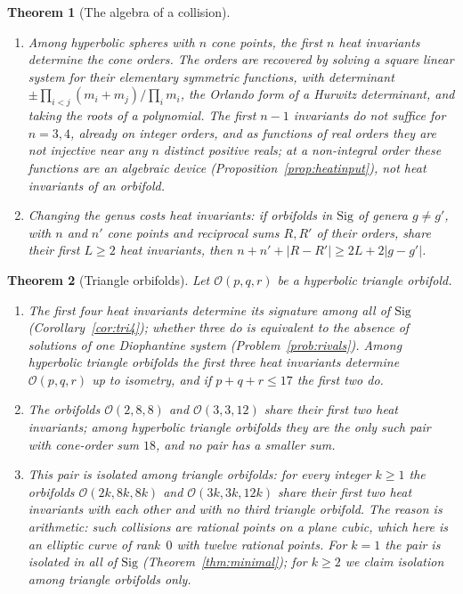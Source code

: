 \documentclass[pdflatex,sn-mathphys-num]{sn-jnl}
\theoremstyle{thmstyleone}%
\newtheorem{theorem}{Theorem}[section]%
\theoremstyle{thmstylethree}%
\newcommand{\Orb}{\mathcal{O}}
\newcommand{\Sig}{\mathrm{Sig}}
\begin{document}
\begin{theorem}[The algebra of a collision]\label{thm:intro-algebra}
\leavevmode
\begin{enumerate}[label=(\roman*)]
\item Among hyperbolic spheres with $n$ cone points, the first $n$ heat invariants determine the cone orders. The orders are recovered by solving a square linear system for their elementary symmetric functions, with determinant $\pm\prod_{i<j}(m_i+m_j)/\prod_im_i$, the Orlando form of a Hurwitz determinant, and taking the roots of a polynomial. The first $n-1$ invariants do not suffice for $n=3,4$, already on integer orders, and as functions of real orders they are not injective near any $n$ distinct positive reals; at a non-integral order these functions are an algebraic device (Proposition~\ref{prop:heatinput}), not heat invariants of an orbifold.
\item Changing the genus costs heat invariants: if orbifolds in $\Sig$ of genera $g\ne g'$, with $n$ and $n'$ cone points and reciprocal sums $R,R'$ of their orders, share their first $L\ge2$ heat invariants, then $n+n'+|R-R'|\ge2L+2|g-g'|$.
\end{enumerate}
\end{theorem}

\begin{theorem}[Triangle orbifolds]\label{thm:intro-rigid}
Let $\Orb(p,q,r)$ be a hyperbolic triangle orbifold.
\begin{enumerate}[label=(\roman*)]
\item The first four heat invariants determine its signature among all of $\Sig$ (Corollary~\ref{cor:tri4}); whether three do is equivalent to the absence of solutions of one Diophantine system (Problem~\ref{prob:rivals}). Among hyperbolic triangle orbifolds the first three heat invariants determine $\Orb(p,q,r)$ up to isometry, and if $p+q+r\le17$ the first two do.
\item The orbifolds $\Orb(2,8,8)$ and $\Orb(3,3,12)$ share their first two heat invariants; among hyperbolic triangle orbifolds they are the only such pair with cone-order sum $18$, and no pair has a smaller sum.
\item This pair is isolated among triangle orbifolds: for every integer $k\ge1$ the orbifolds $\Orb(2k,8k,8k)$ and $\Orb(3k,3k,12k)$ share their first two heat invariants with each other and with no third triangle orbifold. The reason is arithmetic: such collisions are rational points on a plane cubic, which here is an elliptic curve of rank~$0$ with twelve rational points. For $k=1$ the pair is isolated in all of $\Sig$ (Theorem~\ref{thm:minimal}); for $k\ge2$ we claim isolation among triangle orbifolds only.
\end{enumerate}
\end{theorem}
\end{document}
